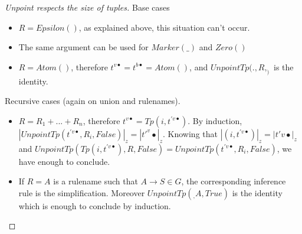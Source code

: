 \documentclass{article}
\newtheorem{proof}{Proof}
\begin{document}
\begin{proof}[Unpoint respects the size of tuples]
Base cases
\begin{itemize}
	\item
$R = Epsilon()$, as explained above, this situation can't occur.
	\item
The same argument can be used for $Marker(\_)$ and $Zero()$
	\item
$R = Atom()$, therefore $t^{v\bullet} = t^{b\bullet} = Atom()$, and $UnpointTp(., R, _)$ is the identity.
\end{itemize}
Recursive cases (again on union and rulenames).
\begin{itemize}
	\item
$R = R_1 + ... + R_n$, therefore $t^{v\bullet} = Tp(i, t^{'v\bullet})$. By induction, $|UnpointTp(t^{'v\bullet}, R_i, False)|_z = |t{'^v\bullet}|_z$. Knowing that $|(i, t^{'v\bullet})|_z = |t{'v\bullet}|_z$ and $UnpointTp(Tp(i, t^{'v\bullet}), R, False) = UnpointTp(t^{'v\bullet}, R_i, False)$, we have enough to conclude.

	\item
If $R = A$ is a rulename such that $A \rightarrow S \in G$, the corresponding inference rule is the simplification. Moreover $UnpointTp(_, A, True)$ is the identity which is enough to conclude by induction.
\end{itemize}
\end{proof}
\end{document}
